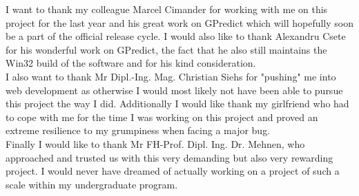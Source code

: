 I want to thank my colleague Marcel Cimander for working with me on this project for the last year and his great work on GPredict which will hopefully soon be a part of the official release cycle. I would also like to thank Alexandru Csete for his wonderful work on GPredict, the fact that he also still maintains the Win32 build of the software and for his kind consideration.\\

I also want to thank Mr Dipl.-Ing. Mag. Christian Siehs for "pushing" me into web development as otherwise I would most likely not have been able to pursue this project the way I did. Additionally I would like thank my girlfriend who had to cope with me for the time I was working on this project and proved an extreme resilience to my grumpiness when facing a major bug.\\

Finally I would like to thank Mr FH-Prof. Dipl. Ing. Dr. Mehnen, who approached and trusted us with this very demanding but also very rewarding project. I would never have dreamed of actually working on a project of such a scale within my undergraduate program.